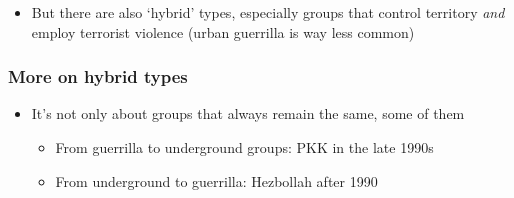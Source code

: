 \documentclass[aspectratio=43]{beamer}
\begin{document}
\begin{frame}[plain]


    \vspace{150pt}

    \begin{itemize}
      \item But there are also `hybrid' types, especially groups that control territory \textit{and} employ terrorist violence (urban guerrilla is way less common)
    \end{itemize}

\end{frame}


\begin{frame}
\frametitle{More on hybrid types}
\centering

\begin{itemize}
  \item It's not only about groups that always remain the same, some of them {\color{red}{transition over time}}
  \begin{itemize}
    \item<2-> From guerrilla to underground groups: PKK in the late 1990s
    \item<3-> From underground to guerrilla: Hezbollah after 1990
  \end{itemize}
\end{itemize}


\end{frame}
\end{document}
